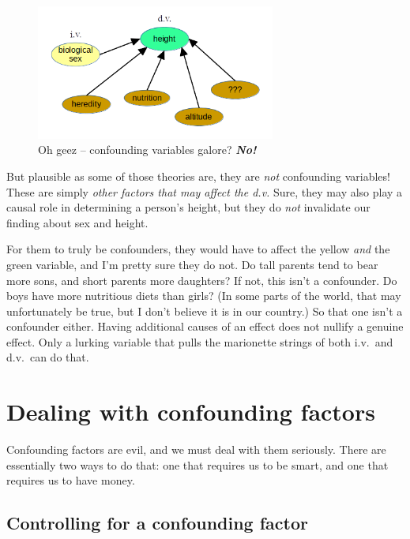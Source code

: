 \begin{figure}[ht]
\centering
\includegraphics[width=0.7\textwidth]{sexHeight2.png}
\caption{Oh geez -- confounding variables galore? \textbf{\textit{No!}}}
\label{fig:sexHeight2}
\end{figure}

But plausible as some of those theories are, they are \textit{not} confounding
variables! These are simply \textit{other factors that may affect the d.v.}
Sure, they may also play a causal role in determining a person's height, but
they do \textit{not} invalidate our finding about sex and height.

For them to truly be confounders, they would have to affect the yellow
\textit{and} the green variable, and I'm pretty sure they do not. Do tall
parents tend to bear more sons, and short parents more daughters? If not, this
isn't a confounder. Do boys have more nutritious diets than girls? (In some
parts of the world, that may unfortunately be true, but I don't believe it is
in our country.) So that one isn't a confounder either. Having additional
causes of an effect does not nullify a genuine effect. Only a lurking variable
that pulls the marionette strings of both i.v.~and d.v.~can do that.

\section{Dealing with confounding factors}


\label{smart}
Confounding factors are evil, and we must deal with them seriously. There are
essentially two ways to do that: one that requires us to be smart, and one that
requires us to have money.

\subsection{Controlling for a confounding factor}

